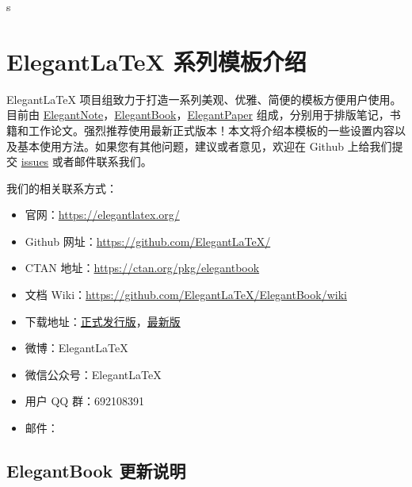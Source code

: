 s\chapter{Elegant\LaTeX{} 系列模板介绍}
	
	
	Elegant\LaTeX{} 项目组致力于打造一系列美观、优雅、简便的模板方便用户使用。目前由 \href{https://github.com/ElegantLaTeX/ElegantNote}{ElegantNote}，\href{https://github.com/ElegantLaTeX/ElegantBook}{ElegantBook}，\href{https://github.com/ElegantLaTeX/ElegantPaper}{ElegantPaper} 组成，分别用于排版笔记，书籍和工作论文。强烈推荐使用最新正式版本！本文将介绍本模板的一些设置内容以及基本使用方法。如果您有其他问题，建议或者意见，欢迎在 Github 上给我们提交 \href{https://github.com/ElegantLaTeX/ElegantBook/issues}{issues} 或者邮件联系我们。
	
	我们的相关联系方式：
	\begin{itemize}
	\item 官网：\href{https://elegantlatex.org/}{https://elegantlatex.org/}
	\item Github 网址：\href{https://github.com/ElegantLaTeX/}{https://github.com/ElegantLaTeX/}
	\item CTAN 地址：\href{https://ctan.org/pkg/elegantbook}{https://ctan.org/pkg/elegantbook}
	\item 文档 Wiki：\href{https://github.com/ElegantLaTeX/ElegantBook/wiki}{https://github.com/ElegantLaTeX/ElegantBook/wiki}
	\item 下载地址：\href{https://github.com/ElegantLaTeX/ElegantBook/releases}{正式发行版}，\href{https://github.com/ElegantLaTeX/ElegantBook/archive/master.zip}{最新版}
	\item 微博：ElegantLaTeX
	\item 微信公众号：ElegantLaTeX
	\item 用户 QQ 群：692108391 
	\item 邮件：
	\end{itemize}
	
	
	\section{ElegantBook 更新说明}
	
